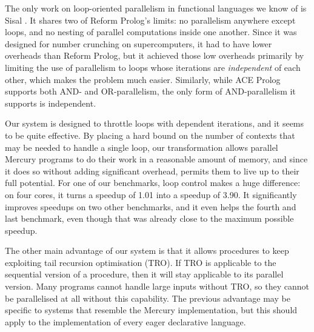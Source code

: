 The only work on loop-oriented parallelism in functional languages
we know of is Sisal \citep{feo:1990:sisal-report}.
It shares two of Reform Prolog's limits:
no parallelism anywhere except loops, and
no nesting of parallel computations inside one another.
Since it was designed for number crunching on supercomputers,
it had to have lower overheads than Reform Prolog,
but it achieved those low overheads
primarily by limiting the use of parallelism
to loops whose iterations are \emph{independent} of each other,
which makes the problem much easier.
Similarly, while ACE Prolog supports both AND- and OR-parallelism,
the only form of AND-parallelism it supports is independent.

Our system is designed to throttle loops with dependent iterations,
and it seems to be quite effective.
By placing a hard bound on the number of contexts
that may be needed to handle a single loop,
our transformation allows parallel Mercury programs
to do their work in a reasonable amount of memory,
and since it does so without adding significant overhead,
permits them to live up to their full potential.
For one of our benchmarks,
loop control makes a huge difference:
on four cores, it turns a speedup of 1.01 into a speedup of 3.90.
It significantly improves speedups on two other benchmarks,
and it even helps the fourth and last benchmark,
even though that was already close to the maximum possible speedup.

The other main advantage of our system
is that it allows procedures to keep exploiting tail recursion optimisation
(TRO).
If TRO is applicable to the sequential version of a procedure,
then it will stay applicable to its parallel version.
Many programs cannot handle large inputs without TRO,
so they cannot be parallelised at all without this capability.
The previous advantage may be specific
to systems that resemble the Mercury implementation,
but this should apply to the implementation
of every eager declarative language.


%
%
%
%



